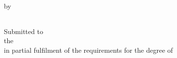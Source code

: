\thispagestyle{empty}
\onehalfspacing
\begin{center}
	\null
	\vfill
	\MakeUppercase{\textbf{\thesistitle}} \\
	\vfill
	by \\
	\student \\

	\vspace{5em}

	Submitted to \\
	the \school \\
	in partial fulfilment of the requirements for the degree of \\
	\degree \\

	\vspace{5em}

	\uni \\
	\uniloc \\
	\month~\year

\end{center}
